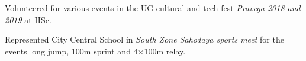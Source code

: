 \documentclass[margin, 10pt]{res} %
\begin{document}
\begin{resume}
\smallskip

Volunteered for various events in the UG cultural and
tech fest {\it Pravega 2018 and 2019} at IISc.

\smallskip

Represented City Central School in {\it South Zone Sahodaya sports meet}
for the events long jump, 100m sprint and 4$\times$100m relay.


\end{resume}
\end{document}
